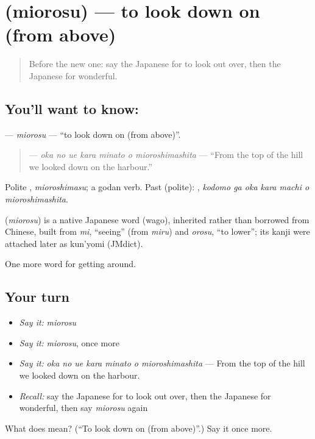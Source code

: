 \section[\texorpdfstring{\ja{みおろす} (miorosu)}{みおろす (miorosu)}]{ (miorosu) — to look down on (from above)}

\label{lesson:JA-C404-miorosu}



\begin{quote}
Before the new one: say the Japanese for to look out over, then the Japanese for wonderful.
\end{quote}

\subsection*{You'll want to know: }
\textbf{} — \emph{miorosu} — \textquotedblleft{}to look down on (from above)\textquotedblright{}.

\begin{quote}
\textbf{   } — \emph{oka no ue kara minato o mioroshimashita} — \textquotedblleft{}From the top of the hill we looked down on the harbour.\textquotedblright{}
\end{quote}

Polite \textbf{}, \emph{mioroshimasu}; a godan verb. Past (polite): \textbf{   }, \emph{kodomo ga oka kara machi o mioroshimashita}.

\begin{cousinweb}
\textbf{} (\emph{miorosu}) is a native Japanese word (wago), inherited rather than borrowed from Chinese, built from \emph{mi}, \textquotedblleft{}seeing\textquotedblright{} (from \emph{miru}) and \emph{orosu}, \textquotedblleft{}to lower\textquotedblright{}; its kanji were attached later as kun'yomi (JMdict).
\end{cousinweb}

\begin{grammarlens}[title={What you've built}]
One more word for getting around.
\end{grammarlens}

\subsection*{Your turn}
\begin{itemize}
\raggedright
  \item \emph{Say it:} \emph{miorosu}
  \item \emph{Say it:} \emph{miorosu}, once more
  \item \emph{Say it:} \emph{oka no ue kara minato o mioroshimashita} — From the top of the hill we looked down on the harbour.
  \item \emph{Recall:} say the Japanese for to look out over, then the Japanese for wonderful, then say \emph{miorosu} again
\end{itemize}

\begin{tcolorbox}[breakable,colback=teal!4,colframe=teal!35!black,title={Before you move on}]
What does  mean? (\textquotedblleft{}To look down on (from above)\textquotedblright{}.) Say it once more.
\end{tcolorbox}
